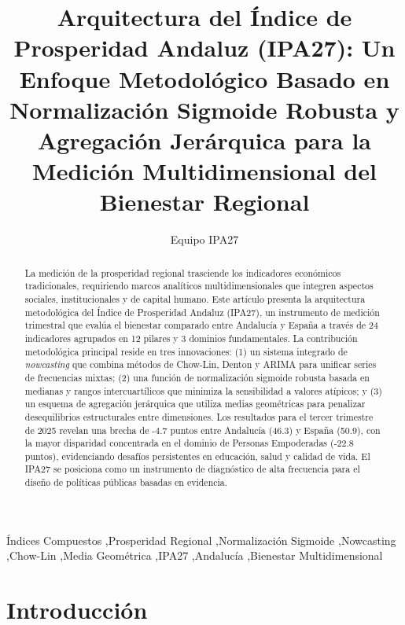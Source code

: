 \documentclass[authoryear,12pt]{elsarticle}
\begin{document}
\begin{frontmatter}

\title{Arquitectura del Índice de Prosperidad Andaluz (IPA27): Un Enfoque Metodológico Basado en Normalización Sigmoide Robusta y Agregación Jerárquica para la Medición Multidimensional del Bienestar Regional}

\author[sev]{Equipo IPA27}
\address[sev]{Instituto de Estudios Regionales, Sevilla, España}


\begin{abstract}
La medición de la prosperidad regional trasciende los indicadores económicos tradicionales, requiriendo marcos analíticos multidimensionales que integren aspectos sociales, institucionales y de capital humano. Este artículo presenta la arquitectura metodológica del Índice de Prosperidad Andaluz (IPA27), un instrumento de medición trimestral que evalúa el bienestar comparado entre Andalucía y España a través de 24 indicadores agrupados en 12 pilares y 3 dominios fundamentales. La contribución metodológica principal reside en tres innovaciones: (1) un sistema integrado de \textit{nowcasting} que combina métodos de Chow-Lin, Denton y ARIMA para unificar series de frecuencias mixtas; (2) una función de normalización sigmoide robusta basada en medianas y rangos intercuartílicos que minimiza la sensibilidad a valores atípicos; y (3) un esquema de agregación jerárquica que utiliza medias geométricas para penalizar desequilibrios estructurales entre dimensiones. Los resultados para el tercer trimestre de 2025 revelan una brecha de -4.7 puntos entre Andalucía (46.3) y España (50.9), con la mayor disparidad concentrada en el dominio de Personas Empoderadas (-22.8 puntos), evidenciando desafíos persistentes en educación, salud y calidad de vida. El IPA27 se posiciona como un instrumento de diagnóstico de alta frecuencia para el diseño de políticas públicas basadas en evidencia.
\end{abstract}

\begin{keyword}
Índices Compuestos \sep Prosperidad Regional \sep Normalización Sigmoide \sep Nowcasting \sep Chow-Lin \sep Media Geométrica \sep IPA27 \sep Andalucía \sep Bienestar Multidimensional
\end{keyword}

\end{frontmatter}

\section{Introducción}
\end{document}
